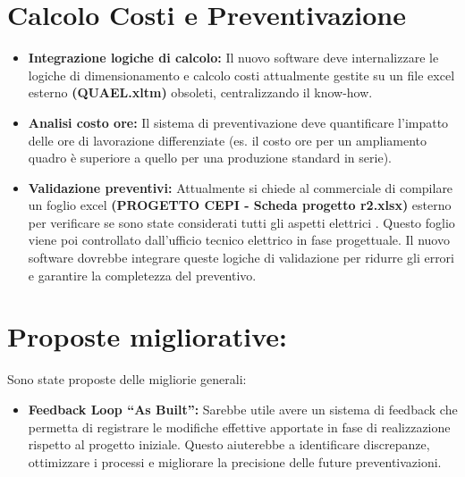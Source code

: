 \documentclass[12pt, a4paper]{article} %
\begin{document}
\section{Calcolo Costi e Preventivazione}
\begin{itemize}
      \item \textbf{Integrazione logiche di calcolo:}
            Il nuovo software deve internalizzare le logiche di dimensionamento e calcolo costi attualmente gestite su un file excel esterno \textbf{(QUAEL.xltm)} obsoleti,
            centralizzando il know-how.

      \item \textbf{Analisi costo ore:}
            Il sistema di preventivazione deve quantificare l'impatto delle ore di lavorazione differenziate
            (es. il costo ore per un ampliamento quadro è superiore a quello per una produzione standard in serie).
      \item \textbf{Validazione preventivi:} Attualmente si chiede al commerciale di compilare un foglio excel \textbf{(PROGETTO CEPI - Scheda progetto r2.xlsx)}
            esterno per verificare se sono state considerati
            tutti gli aspetti elettrici . Questo foglio viene poi controllato dall'ufficio tecnico elettrico in fase progettuale.
            Il nuovo software dovrebbe integrare queste logiche di validazione per ridurre gli errori e garantire la completezza del preventivo.
\end{itemize}

\section{Proposte migliorative:}
Sono state proposte delle migliorie generali:
\begin{itemize}
      \item \textbf{Feedback Loop ``As Built'':}
            Sarebbe utile avere un sistema di feedback che permetta di registrare le modifiche effettive apportate in fase di realizzazione rispetto al progetto iniziale.
            Questo aiuterebbe a identificare discrepanze, ottimizzare i processi e migliorare la precisione delle future preventivazioni.
\end{itemize}
\end{document}
